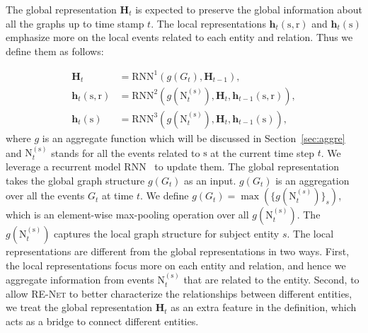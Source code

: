 \documentclass[11pt,a4paper]{article}
\newcommand{\bH}{\boldsymbol{H}}
\newcommand{\bh}{\boldsymbol{h}}
\newcommand{\calE}{G}
\newcommand{\method}{\textsc{RE-Net}\xspace}
\newcommand{\teN}{\text{N}}
\newcommand{\bs}{\mathrm{s}}
\newcommand{\br}{\mathrm{r}}
\renewcommand{\bh}{\boldsymbol{h}}
\begin{document}

The global representation $\bH_t$ is expected to preserve the global information about all the graphs up to time stamp $t$.
The local representations $\bh_t(\bs, \br)$ and $\bh_t(\bs)$ emphasize more on the local events related to each entity and relation.
Thus we define them as follows:

\small
\begin{align}
    \bH_{t} &= \textrm{RNN}^1(g(\calE_t), \bH_{t-1}), \label{eq:globalh}\\
	\bh_{t}(\bs,\br) &= \textrm{RNN}^2(g(\teN^{(\bs)}_{t}), \bH_{t}, \bh_{t-1}(\bs,\br)),\\
	\bh_{t}(\bs) &= \textrm{RNN}^3(g(\teN^{(\bs)}_{t}), \bH_{t},\bh_{t-1}(\bs)),
\end{align}
\normalsize
where $g$ is an aggregate function which will be discussed in Section~\ref{sec:aggre} and $\teN^{(\bs)}_{t}$ stands for all the events related to $\bs$ at the current time step $t$.
We leverage a recurrent model $\textrm{RNN}$~\cite{Cho2014LearningPR} to update them.
The global representation takes the global graph structure $g(\calE_t)$ as an input.
$g(\calE_t)$ is an aggregation over all the events $\calE_t$ at time $t$. 
We define {\small$g(\calE_t) = \max(\{g(\teN_t^{(s)})\}_s)$}, which is an element-wise max-pooling operation over all {\small$g(\teN^{(\bs)}_{t})$}. The $g(\teN^{(\bs)}_{t})$ captures the local graph structure for subject entity $s$. 
The local representations are different from the global representations in two ways.
First, the local representations focus more on each entity and relation, and hence we aggregate information from events $\teN^{(\bs)}_{t}$ that are related to the entity. Second, to allow \method to better characterize the relationships between different entities, we treat the global representation $\bH_{t}$ as an extra feature in the definition, which acts as a bridge to connect different entities.
\end{document}
